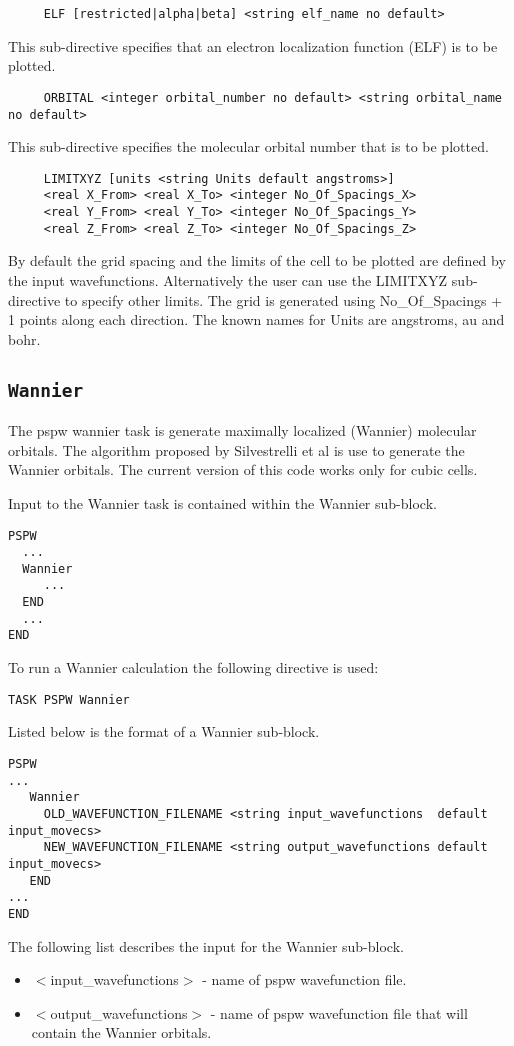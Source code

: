 \begin{verbatim}
     ELF [restricted|alpha|beta] <string elf_name no default>
\end{verbatim}
This sub-directive specifies that an electron localization function (ELF) is to be plotted.

\begin{verbatim}
     ORBITAL <integer orbital_number no default> <string orbital_name no default>
\end{verbatim}
This sub-directive specifies the molecular orbital number that is to be plotted.

\begin{verbatim}
     LIMITXYZ [units <string Units default angstroms>]
     <real X_From> <real X_To> <integer No_Of_Spacings_X>
     <real Y_From> <real Y_To> <integer No_Of_Spacings_Y>
     <real Z_From> <real Z_To> <integer No_Of_Spacings_Z>
\end{verbatim}
By default the grid spacing and the limits of the cell to be plotted are defined by the input wavefunctions.  Alternatively the user can use the LIMITXYZ sub-directive to specify other limits.   The grid is generated using No\_Of\_Spacings + 1 points along each direction. The known names for Units are angstroms, au and bohr. 



\subsection{\tt Wannier}
\label{sec:pspw_wannier}
The pspw wannier task is generate maximally localized (Wannier) molecular orbitals.  The
algorithm proposed by Silvestrelli et al is use to generate the Wannier orbitals.  The
current version of this code works only for cubic cells. 


Input to the Wannier task is contained within the Wannier sub-block.
\begin{verbatim}
PSPW
  ...
  Wannier
     ...
  END
  ...
END
\end{verbatim}
To run a Wannier calculation the following directive 
is used:
\begin{verbatim}
TASK PSPW Wannier
\end{verbatim}
Listed below is the format of a Wannier sub-block.
\begin{verbatim}
PSPW
... 
   Wannier
     OLD_WAVEFUNCTION_FILENAME <string input_wavefunctions  default input_movecs>  
     NEW_WAVEFUNCTION_FILENAME <string output_wavefunctions default input_movecs>
   END
...
END
\end{verbatim}
The following list describes the input for the Wannier
sub-block.
\begin{itemize}
        \item $<$input\_wavefunctions$>$ - name of pspw wavefunction file.
        \item $<$output\_wavefunctions$>$ - name of pspw wavefunction file that
              will contain the Wannier orbitals. 
\end{itemize}



